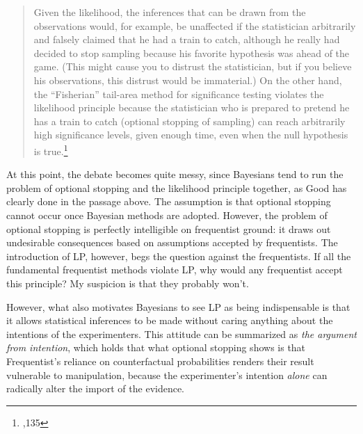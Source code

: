 \begin{quote}
Given the likelihood, the inferences that can be drawn from the
observations would, for example, be unaffected if the statistician
arbitrarily and falsely claimed that he had a train to catch, although
he really had decided to stop sampling because his favorite hypothesis
was ahead of the game. (This might cause you to distrust the
statistician, but if you believe his observations, this distrust would
be immaterial.) On the other hand, the ``Fisherian'' tail-area method
for significance testing violates the likelihood principle because the
statistician who is prepared to pretend he has a train to catch
(optional stopping of sampling) can reach arbitrarily high significance
levels, given enough time, even when the null hypothesis is true.\footnote{\cite{goodthinking},135}
\end{quote}





At this point, the debate becomes quite messy, since Bayesians tend to
run the problem of optional stopping and the likelihood principle
together, as Good has clearly done in the passage above. The assumption
is that optional stopping cannot occur once Bayesian methods are
adopted. However, the problem of optional stopping is perfectly
intelligible on frequentist ground: it draws out undesirable
consequences based on assumptions accepted by frequentists. The
introduction of LP, however, begs the question against the frequentists.
If all the fundamental frequentist methods violate LP, why would any
frequentist accept this principle? My suspicion is that they probably
won't.

However, what also motivates Bayesians to see LP as being indispensable
is that it allows statistical inferences to be made without caring
anything about the intentions of the experimenters. This attitude can be
summarized as \emph{the argument from intention}, which holds that what
optional stopping shows is that Frequentist's reliance on counterfactual
probabilities renders their result vulnerable to manipulation, because
the experimenter's intention \emph{alone} can radically alter the import
of the evidence.

